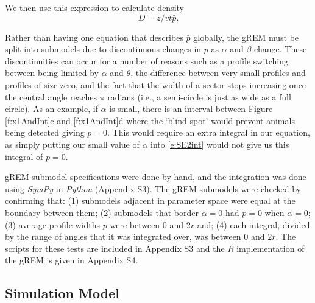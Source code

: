 We then use this expression to calculate density
\begin{equation}
\label{e:gas}
D = z/vt\bar{p}.
\end{equation}


Rather than having one equation that describes $\bar{p}$ globally, the gREM must be split into submodels due to discontinuous changes in $p$ as $\alpha$ and $\beta$ change.
These discontinuities can occur for a number of reasons such as a profile switching between being limited by $\alpha$ and $\theta$, the difference between very small profiles and profiles of size zero, and the fact that the width of a sector stops increasing once the central angle reaches $\pi$ radians (i.e., a semi-circle is just as wide as a full circle).
As an example, if $\alpha$ is small, there is an interval between Figure \ref{f:x1AndInt}c and \ref{f:x1AndInt}d where the `blind spot' would prevent animals being detected giving $p=0$.
This would require an extra integral in our equation, as simply putting our small value of $\alpha$ into \ref{e:SE2int} would not give us this integral of $p=0$.

gREM submodel specifications were done by hand, and the integration was done using \emph{SymPy} \cite{sympy} in \emph{Python} (Appendix S3).
The gREM submodels were checked by confirming that: (1) submodels adjacent in parameter space were equal at the boundary between them; (2) submodels that border $ \alpha = 0$ had $p = 0$ when $ \alpha = 0$; (3) average profile widths $\bar{p}$ were between 0 and $2r$ and; (4) each integral, divided by the range of angles that it was integrated over, was between 0 and $2r$.
The scripts for these tests are included in Appendix S3 and the \emph{R} \cite{R} implementation of the gREM is given in Appendix S4.  

\subsection{Simulation Model}

